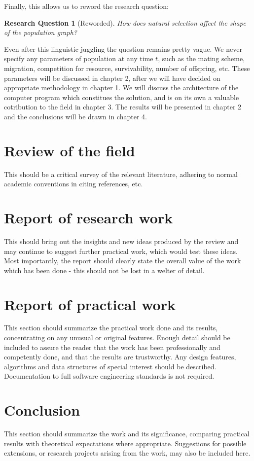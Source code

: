 \documentclass{l4proj}
\newtheorem*{quest}{Research Question}
\begin{document}
Finally, this allows us to reword the research question:

\begin{quest}[Reworded]
How does natural selection affect the shape of the population graph?
\end{quest}

Even after this linguistic juggling the question remains pretty vague. We never specify any parameters of population at any time $t$, such as the mating scheme, migration, competition for resource, survivability, number of offspring, etc. These parameters will be discussed in chapter 2, after we will have decided on appropriate methodology in chapter 1. We will discuss the architecture of the computer program which constitues the solution, and is on its own a valuable cotribution to the field in chapter 3. The results will be presented in chapter 2 and the conclusions will be drawn in chapter 4.

\chapter{Review of the field}
This should be a critical survey of the relevant literature, adhering to normal academic conventions in citing references, etc.

\chapter{Report of research work}
This should bring out the insights and new ideas produced by the review and may continue to suggest further practical work, which would test these ideas. Most importantly, the report should clearly state the overall value of the work which has been done - this should not be lost in a welter of detail.

\chapter{Report of practical work}
This section should summarize the practical work done and its results, concentrating on any unusual or original features. Enough detail should be included to assure the reader that the work has been professionally and competently done, and that the results are trustworthy. Any design features, algorithms and data structures of special interest should be described. Documentation to full software engineering standards is not required.

\chapter{Conclusion}
This section should summarize the work and its significance, comparing practical results with theoretical expectations where appropriate. Suggestions for possible extensions, or research projects arising from the work, may also be included here.
\end{document}
